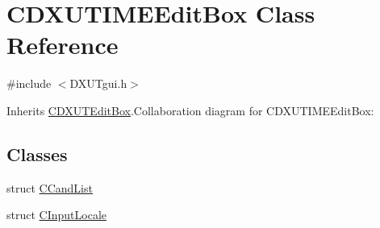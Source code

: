 \hypertarget{class_c_d_x_u_t_i_m_e_edit_box}{
\section{CDXUTIMEEditBox Class Reference}
\label{class_c_d_x_u_t_i_m_e_edit_box}
}


{\ttfamily \#include $<$DXUTgui.h$>$}

Inherits \hyperlink{class_c_d_x_u_t_edit_box}{CDXUTEditBox}.Collaboration diagram for CDXUTIMEEditBox:\subsection*{Classes}
\begin{DoxyCompactItemize}
\item 
struct \hyperlink{struct_c_d_x_u_t_i_m_e_edit_box_1_1_c_cand_list}{CCandList}
\item 
struct \hyperlink{struct_c_d_x_u_t_i_m_e_edit_box_1_1_c_input_locale}{CInputLocale}
\end{DoxyCompactItemize}
